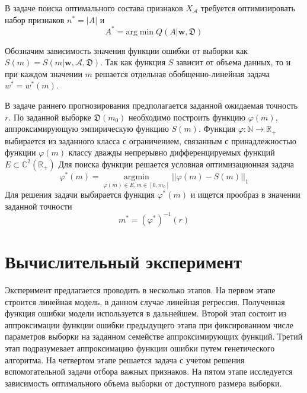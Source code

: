 \documentclass[12pt, twoside]{article}
\newcommand{\mb}[1]{\mathbf{#1}}
\begin{document}
В задаче поиска оптимального состава признаков $X_{\mathcal{A}}$ требуется оптимизировать набор признаков $n^* = |A|$ и $$A^* = \text{arg} \min Q(A| \textbf{w}, \mathfrak{D})$$

Обозначим зависимость значения функции ошибки от выборки как $S(m) = S(m| \textbf{w}, \mathcal{A}, \mathfrak{D})$. Так как функция $S$ зависит от объема данных, то и при каждом значении $m$ решается отдельная обобщенно-линейная задача $w^* = w^*(m)$.


В задаче раннего прогнозирования предполагается заданной ожидаемая точность $r$. По заданной выборке $\mathfrak{D}(m_0)$ необходимо построить функцию $\varphi(m)$, аппроксимирующую эмпирическую функцию $S(m)$. Функция $\varphi: \mathbb{N} \rightarrow \mathbb{R}_+$ выбирается из заданного класса с ограничением, связанным с принадлежностью функции $\varphi(m)$ классу дважды непрерывно дифференцируемых функций $E \subset \mathbb{C}^2(\mathbb{R}_+)$ Для поиска функции решается условная оптимизационная задача 
\begin{equation}\label{eq_app_1}
\varphi^*(m) = \underset{\varphi(m) \in E, m \in [0, m_0]}{\text{arg} \min} ||\varphi(m) - S(m)||_1
\end{equation} 
Для решения задачи выбирается функция $\varphi^*(m)$ и ищется прообраз в значении заданной точности $$m^* = (\varphi^*)^{-1}(r)$$
\section{Вычислительный эксперимент}
Эксперимент предлагается проводить в несколько этапов. На первом этапе строится линейная модель, в данном случае линейная регрессия. Полученная функция ошибки модели используется в дальнейшем. Второй этап состоит из аппроксимации функции ошибки предыдущего этапа при фиксированном числе параметров выборки на заданном семействе аппроксимирующих функций. Третий этап подразумевает аппроксимацию функции ошибки путем генетического алгоритма. На четвертом этапе решается задача с учетом решения вспомогательной задачи отбора важных признаков. На пятом этапе исследуется зависимость оптимального объема выборки от доступного размера выборки.
\end{document}

